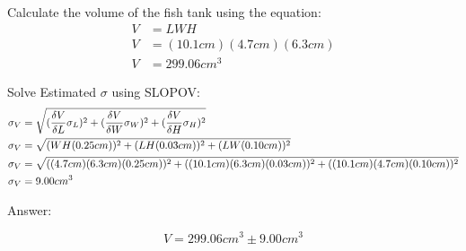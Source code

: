 Calculate the volume of the fish tank using the equation:
\begin{align*}
V &= LWH \\
V &= (10.1cm)(4.7cm)(6.3cm) \\
V &= 299.06 cm^3
\end{align*}

Solve Estimated $\sigma$ using SLOPOV:
\begin{align*}
\sigma_{V} &= \sqrt{(\frac{\delta V}{\delta L} \sigma_{L})^2+(\frac{\delta V}{\delta W} \sigma_{W})^2+(\frac{\delta V}{\delta H} \sigma_{H})^2} \\
\sigma_{V} &= \sqrt{(WH (0.25cm))^2+(LH (0.03cm))^2+(LW (0.10cm))^2} \\
\sigma_{V} &= \sqrt{((4.7cm)(6.3cm)(0.25cm))^2+((10.1cm)(6.3cm) (0.03cm))^2+((10.1cm)(4.7cm) (0.10cm))^2} \\
\sigma_V &= 9.00 cm^3
\end{align*}

Answer:

\[
V = 299.06 cm^3 \pm 9.00 cm^3
\]